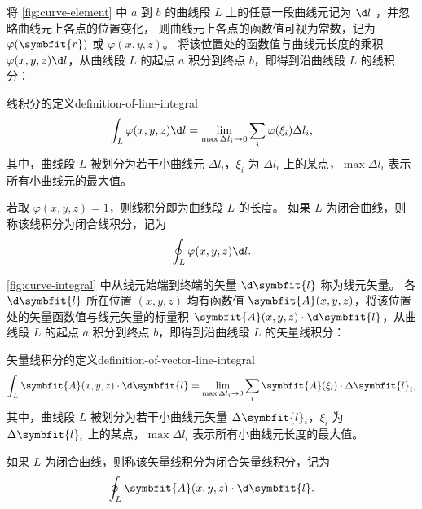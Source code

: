 
将 \cref{fig:curve-element} 中 $ a $ 到 $ b $ 的曲线段 $ L $ 上的任意一段曲线元记为 $ \d l $ ，并忽略曲线元上各点的位置变化，
则曲线元上各点的函数值可视为常数，记为 $ \varphi (\symbfit{r}) $ 或 $ \varphi (x, y, z) $。
将该位置处的函数值与曲线元长度的乘积 $ \varphi (x, y, z) \d l $，从曲线段 $ L $ 的起点 $ a $ 积分到终点 $ b $，即得到沿曲线段 $ L $ 的线积分：
\begin{definition}{线积分的定义}{definition-of-line-integral}
    \begin{equation}
        \int_L \varphi (x, y, z) \d l = \lim_{\max \Delta l_i \to 0} \sum_{i} \varphi (\xi_i) \Delta l_i ,
    \end{equation}
    其中，曲线段 $ L $ 被划分为若干小曲线元 $ \Delta l_i $，$ \xi_i $ 为 $ \Delta l_i $ 上的某点，$ \max \Delta l_i $ 表示所有小曲线元的最大值。
\end{definition}
若取 $ \varphi (x, y, z) = 1 $，则线积分即为曲线段 $ L $ 的长度。
如果 $ L $ 为闭合曲线，则称该线积分为闭合线积分，记为
\begin{equation}
    \oint_L \varphi (x, y, z) \d l .
\end{equation}

\bigskip


\cref{fig:curve-integral} 中从线元始端到终端的矢量 $ \d \symbfit{l} $ 称为线元矢量。
各 $ \d \symbfit{l} $ 所在位置 $ (x, y, z) $ 均有函数值 $ \symbfit{A} (x, y, z) $，将该位置处的矢量函数值与线元矢量的标量积 $ \symbfit{A} (x, y, z) \cdot \d \symbfit{l} $，从曲线段 $ L $ 的起点 $ a $ 积分到终点 $ b $，即得到沿曲线段 $ L $ 的矢量线积分：
\begin{definition}{矢量线积分的定义}{definition-of-vector-line-integral}
    \begin{equation}
        \int_L \symbfit{A} (x, y, z) \cdot \d \symbfit{l} = \lim_{\max \Delta l_i \to 0} \sum_{i} \symbfit{A} (\xi_i) \cdot \Delta \symbfit{l}_i ,
    \end{equation}
    其中，曲线段 $ L $ 被划分为若干小曲线元矢量 $ \Delta \symbfit{l}_i $，$ \xi_i $ 为 $ \Delta \symbfit{l}_i $ 上的某点，$ \max \Delta l_i $ 表示所有小曲线元长度的最大值。
\end{definition}

如果 $ L $ 为闭合曲线，则称该矢量线积分为闭合矢量线积分，记为
\begin{equation}
    \oint_L \symbfit{A} (x, y, z) \cdot \d \symbfit{l} .
\end{equation}

